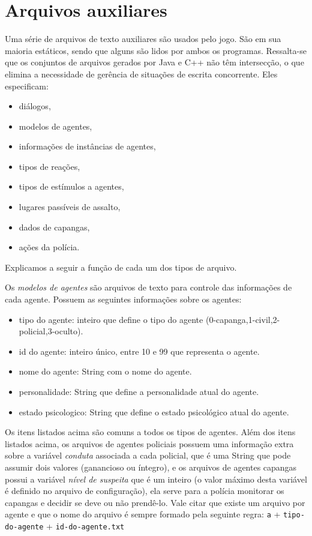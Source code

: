 \section{Arquivos auxiliares}

Uma série de arquivos de texto auxiliares são usados pelo jogo. São em sua maioria estáticos, sendo que alguns são lidos por ambos os programas. Ressalta-se que os conjuntos de arquivos gerados por Java e C++ não têm intersecção, o que elimina a necessidade de gerência de situações de escrita concorrente. Eles especificam:
\begin{itemize}
\item diálogos,
\item modelos de agentes,
\item informações de instâncias de agentes,
\item tipos de reações,
\item tipos de estímulos a agentes,
\item lugares passíveis de assalto,
\item dados de capangas,
\item ações da polícia.
\end{itemize}

Explicamos a seguir a função de cada um dos tipos de arquivo.

Os \emph{modelos de agentes} são arquivos de texto para controle das informações de cada agente. Possuem as seguintes informações sobre os agentes:
\begin{itemize}
\item tipo do agente: inteiro que define o tipo do agente (0-capanga,1-civil,2-policial,3-oculto).
\item id do agente: inteiro único, entre 10 e 99 que representa o agente.
\item nome do agente: String com o nome do agente.
\item personalidade: String que define a personalidade atual do agente.
\item estado psicologico: String que define o estado psicológico atual do agente.
\end{itemize}
Os itens listados acima são comuns a todos os tipos de agentes.
Além dos itens listados acima, os arquivos de agentes policiais possuem uma informação extra sobre a variável \emph{conduta} associada a cada policial, que é uma String que pode assumir dois valores (ganancioso ou íntegro), e os arquivos de agentes capangas possui a variável \emph{nível de suspeita} que é um inteiro (o valor máximo desta variável é definido no arquivo de configuração), ela serve para a polícia monitorar os capangas e decidir se deve ou não prendê-lo.
Vale citar que existe um arquivo por agente e que o nome do arquivo é sempre formado pela seguinte regra: \verb!a! + \verb!tipo-do-agente! + \verb!id-do-agente.txt!


